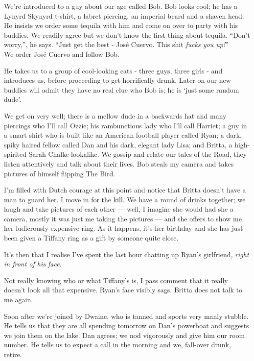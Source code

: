 \documentclass[a5paper,titlepage,11pt]{book}
\begin{document}
We're introduced to a guy about our age called Bob.  Bob looks cool; he has a Lynyrd Skynyrd t-shirt, a labret piercing, an imperial beard and a shaven head.  He insists we order some tequila with him and come on over to party with his buddies.  We readily agree but we don't know the first thing about tequila.  ``Don't worry,'', he says.  ``Just get the best - Jos\'{e} Cuervo.  This shit \emph{fucks you up!}'' \\
We order Jos\'{e} Cuervo and follow Bob.

He takes us to a group of cool-looking cats - three guys, three girls - and introduces us, before proceeding to get horrifically drunk.  Later on our new buddies will admit they have no real clue who Bob is; he is `just some random dude'.

We get on very well; there is a mellow dude in a backwards hat and many piercings who I'll call Ozzie; his rambunctious lady who I'll call Harriet; a guy in a smart shirt who is built like an American football player called Ryan; a dark, spiky haired fellow called Dan and his dark, elegant lady Lisa; and Britta, a high-spirited Sarah Chalke lookalike.  We gossip and relate our tales of the Road, they listen attentively and talk about their lives.  Bob steals my camera and takes pictures of himself flipping The Bird.

I'm filled with Dutch courage at this point and notice that Britta doesn't have a man to guard her.  I move in for the kill.  We have a round of drinks together; we laugh and take pictures of each other --- well, I imagine she would had she a camera, mostly it was just me taking the pictures --- and she offers to show me her ludicrously expensive ring.  As it happens, it's her birthday and she has just been given a Tiffany ring as a gift by someone quite close.

It's then that I realise I've spent the last hour chatting up Ryan's girlfriend, \emph{right in front of his face}.

Not really knowing who or what Tiffany's is, I pass comment that it really doesn't look all that expensive.  Ryan's face visibly sags.  Britta does not talk to me again.

Soon after we're joined by Dwaine, who is tanned and sports very manly stubble.  He tells us that they are all spending tomorrow on Dan's powerboat and suggests we join them on the lake.  Dan agrees; we nod vigorously and give him our room number.  He tells us to expect a call in the morning and we, fall-over drunk, retire.
\end{document}
